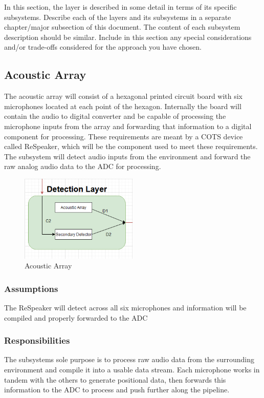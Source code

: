 In this section, the layer is described in some detail in terms of its specific subsystems. Describe each of the layers and its subsystems in a separate chapter/major subsection of this document. The content of each subsystem description should be similar. Include in this section any special considerations and/or trade-offs considered for the approach you have chosen.

\subsection{Acoustic Array}
The acoustic array will consist of a hexagonal printed circuit board with six microphones located at each point of the hexagon. Internally the board will contain the audio to digital converter and be capable of processing the microphone inputs from the array and forwarding that information to a digital component for processing. These requirements are meant by a COTS device called ReSpeaker, which will be the component used to meet these requirements. The subsystem will detect audio inputs from the environment and forward the raw analog audio data to the ADC for processing.

\begin{figure}[h!]
	\centering
 	\includegraphics[width=0.50\textwidth]{images/detection}
 \caption{Acoustic Array}
\end{figure}

\subsubsection{Assumptions}
The ReSpeaker will detect across all six microphones and information will be compiled and properly forwarded to the ADC

\subsubsection{Responsibilities}
The subsystems sole purpose is to process raw audio data from the surrounding environment and compile it into a usable data stream. Each microphone works in tandem with the others to generate positional data, then forwards this information to the ADC to process and push further along the pipeline.

